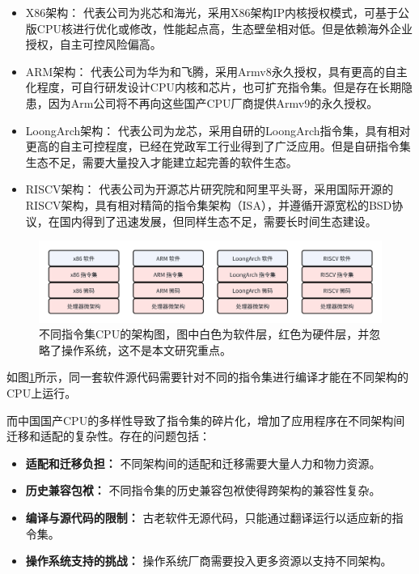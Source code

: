    \begin{itemize}
    \item {X86架构： } 代表公司为兆芯和海光，采用X86架构IP内核授权模式，可基于公版CPU核进行优化或修改，性能起点高，生态壁垒相对低。但是依赖海外企业授权，自主可控风险偏高。
    
    \item{ARM架构：} 代表公司为华为和飞腾，采用Armv8永久授权，具有更高的自主化程度，可自行研发设计CPU内核和芯片，也可扩充指令集。但是存在长期隐患，因为Arm公司将不再向这些国产CPU厂商提供Armv9的永久授权。
    
    \item{LoongArch架构：} 代表公司为龙芯，采用自研的LoongArch指令集，具有相对更高的自主可控程度，已经在党政军工行业得到了广泛应用。但是自研指令集生态不足，需要大量投入才能建立起完善的软件生态。
    
    \item{RISCV架构：} 代表公司为开源芯片研究院和阿里平头哥，采用国际开源的RISCV架构，具有相对精简的指令集架构（ISA），并遵循开源宽松的BSD协议，在国内得到了迅速发展，但同样生态不足，需要长时间生态建设。
    \end{itemize}


\begin{figure}[h]
    \centering
    \includegraphics[width=1\linewidth]{./feishuImage/allCPU_arch.png}
    \caption{不同指令集CPU的架构图，图中白色为软件层，红色为硬件层，并忽略了操作系统，这不是本文研究重点。\protect\footnotemark}
    \label{img:allCPU_arch}
  \end{figure}


如图\ref{img:allCPU_arch}所示，同一套软件源代码需要针对不同的指令集进行编译才能在不同架构的CPU上运行\footnotemark。


    而中国国产CPU的多样性导致了指令集的碎片化，增加了应用程序在不同架构间迁移和适配的复杂性。存在的问题包括：
    \begin{itemize}
    \item \textbf{适配和迁移负担：} 不同架构间的适配和迁移需要大量人力和物力资源。
    
    \item \textbf{历史兼容包袱：} 不同指令集的历史兼容包袱使得跨架构的兼容性复杂。
    
    \item \textbf{编译与源代码的限制：} 古老软件无源代码，只能通过翻译运行以适应新的指令集。
    
    \item \textbf{操作系统支持的挑战：} 操作系统厂商需要投入更多资源以支持不同架构。
    \end{itemize}

